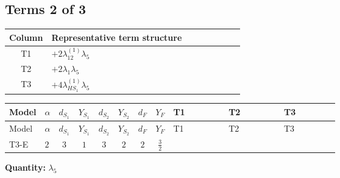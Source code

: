 \documentclass[8pt]{article}
\begin{document}
\begin{landscape}
\subsection*{Terms 2 of 3}
\begin{center}
\begin{tabular}{@{}c >{\raggedright\arraybackslash}p{0.82\linewidth}@{}}
\toprule
Column & Representative term structure \\
\midrule
T1 & \(\displaystyle +2 {\lambda_{12}^{(1)}} {\lambda_5}\) \\
\midrule
T2 & \(\displaystyle +2 {\lambda_1} {\lambda_5}\) \\
\midrule
T3 & \(\displaystyle +4 {\lambda_{HS_1}^{(1)}} {\lambda_5}\) \\
\midrule
\bottomrule
\end{tabular}
\end{center}
\smallskip
\tiny
\begin{longtable}{@{}llcccccc >{\raggedright\arraybackslash}p{0.21\linewidth} >{\raggedright\arraybackslash}p{0.21\linewidth} >{\raggedright\arraybackslash}p{0.21\linewidth}@{}}
\toprule
Model & $\alpha$ & $d_{S_1}$ & $Y_{S_1}$ & $d_{S_2}$ & $Y_{S_2}$ & $d_F$ & $Y_F$ & T1 & T2 & T3 \\
\midrule
\endfirsthead
\toprule
Model & $\alpha$ & $d_{S_1}$ & $Y_{S_1}$ & $d_{S_2}$ & $Y_{S_2}$ & $d_F$ & $Y_F$ & T1 & T2 & T3 \\
\midrule
\endhead
T3-E & $2$ & $3$ & $1$ & $3$ & $2$ & $2$ & $\frac{3}{2}$ & \scriptsize\adjustbox{max width=\linewidth}{$\begin{gathered} +2 {\lambda_{12}^{(1)}} {\lambda_5}\end{gathered}$} & \scriptsize\adjustbox{max width=\linewidth}{$\begin{gathered} +2 {\lambda_1} {\lambda_5}\end{gathered}$} & \scriptsize\adjustbox{max width=\linewidth}{$\begin{gathered} +4 {\lambda_{HS_1}^{(1)}} {\lambda_5}\end{gathered}$} \\
\midrule
\bottomrule
\end{longtable}
\clearpage
\noindent\textbf{Quantity: }$\lambda_5$\par\smallskip

\end{landscape}
\end{document}
